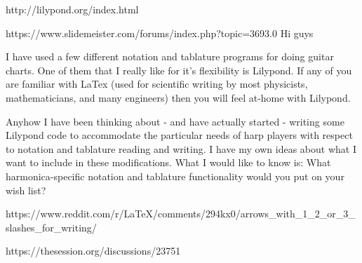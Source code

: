 http://lilypond.org/index.html



https://www.slidemeister.com/forums/index.php?topic=3693.0
Hi guys

I have used  a few different notation and tablature programs for doing guitar charts. One of them that I really like for it's flexibility is Lilypond. If any of you are familiar with LaTex (used for scientific writing by most physicists, mathematicians, and many engineers) then you will feel at-home with Lilypond.

Anyhow I have been thinking about - and have actually started - writing some Lilypond code to accommodate the particular needs of harp players with respect to notation and tablature reading and writing. I have my own ideas about what I want to include in these modifications. What I would like to know is: What harmonica-specific notation and tablature functionality would you put on your wish list?

https://www.reddit.com/r/LaTeX/comments/294kx0/arrows_with_1_2_or_3_slashes_for_writing/

https://thesession.org/discussions/23751